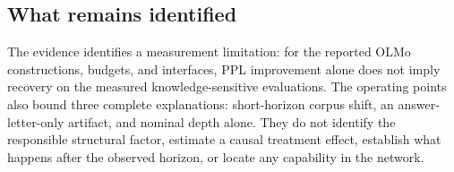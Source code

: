 \subsection{What remains identified}
The evidence identifies a measurement limitation: for the reported OLMo
constructions, budgets, and interfaces, PPL improvement alone does not imply
recovery on the measured knowledge-sensitive evaluations. The operating points
also bound three complete explanations: short-horizon corpus shift, an
answer-letter-only artifact, and nominal depth alone. They do not identify the
responsible structural factor, estimate a causal treatment effect, establish
what happens after the observed horizon, or locate any capability in the
network.
